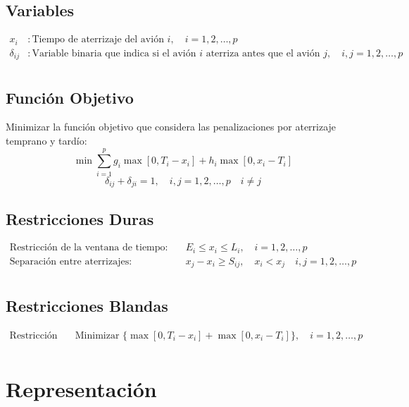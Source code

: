 \documentclass[letter, 10pt]{article}
\begin{document}
\subsection{Variables}
\begin{align*}
x_i & : \text{Tiempo de aterrizaje del avi\'on } i, \quad i = 1,2,\ldots,p \\
\delta_{ij} & : \text{Variable binaria que indica si el avi\'on } i \text{ aterriza antes que el avi\'on } j, \quad i,j = 1,2,\ldots,p \\
\end{align*}


\subsection{Funci\'on Objetivo}
Minimizar la funci\'on objetivo que considera las penalizaciones por aterrizaje temprano y tard\'io:
\[
\min \sum_{i=1}^{p} g_i\max[0,T_i - x_i] + h_i\max[0,x_i - T_i]
\]
\[
\delta_{ij} + \delta_{ji} = 1, \quad i,j = 1,2,\ldots,p \quad i \neq j
\]

\subsection{Restricciones Duras}
\begin{align*}
\text{Restricci\'on de la ventana de tiempo:} & \quad E_i \leq x_i \leq L_i, \quad i = 1,2,\ldots,p \\
\text{Separaci\'on entre aterrizajes:} & \quad x_j - x_i \geq S_{ij},\quad x_i < x_j \quad i, j = 1,2,\ldots,p \\
\end{align*}

\subsection{Restricciones Blandas}
\begin{align*}
\text{Restricci\'on de aterrizaje ideal:} & \quad \text{Minimizar } \{\max[0,T_i - x_i] + \max[0,x_i - T_i]\}, \quad i = 1,2,\ldots,p \\
\end{align*}

\section{Representaci\'on}
\begin{comment}
Representaci\'on de \textbf{soluciones} (arreglos, matrices, etc.). En caso de t\'ecnicas completas indicar variables y dominios. Incluir justificaci\'on y ejemplos para mayor claridad.
\end{comment}
\end{document}
